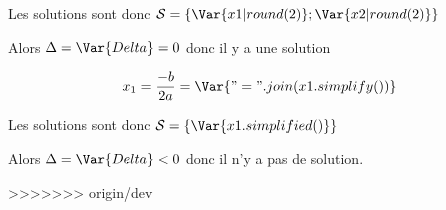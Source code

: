 \documentclass[a4paper,10pt]{article}
\begin{document}
    Les solutions sont donc $\mathcal{S} = \left\{ \Var{x1|round(2)}; \Var{x2|round(2)} \right\}$

    Alors $\Delta = \Var{Delta} = 0$ donc il y a une solution


    \begin{eqnarray*}
        x_1 = \frac{-b}{2a} = \Var{" = ".join(x1.simplify())}
    \end{eqnarray*}

    Les solutions sont donc $\mathcal{S} = \left\{ \Var{x1.simplified()}\right\}$

    Alors $\Delta = \Var{Delta} < 0$ donc il n'y a pas de solution.

>>>>>>> origin/dev
\end{document}
